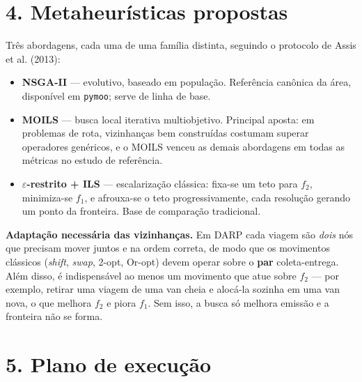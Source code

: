 \documentclass[10pt,a4paper]{article}
\theoremstyle{plain}
\begin{document}
\section*{4. Metaheurísticas propostas}

Três abordagens, cada uma de uma família distinta, seguindo o protocolo de Assis et al. (2013):

\begin{itemize}
    \item \textbf{NSGA-II} --- evolutivo, baseado em população. Referência canônica da área, disponível em \texttt{pymoo}; serve de linha de base.
    \item \textbf{MOILS} --- busca local iterativa multiobjetivo. Principal aposta: em problemas de rota, vizinhanças bem construídas costumam superar operadores genéricos, e o MOILS venceu as demais abordagens em todas as métricas no estudo de referência.
    \item \textbf{$\varepsilon$-restrito + ILS} --- escalarização clássica: fixa-se um teto para $f_2$, minimiza-se $f_1$, e afrouxa-se o teto progressivamente, cada resolução gerando um ponto da fronteira. Base de comparação tradicional.
\end{itemize}

\textbf{Adaptação necessária das vizinhanças.} Em DARP cada viagem são \textit{dois} nós que precisam mover juntos e na ordem correta, de modo que os movimentos clássicos (\textit{shift}, \textit{swap}, 2-opt, Or-opt) devem operar sobre o \textbf{par} coleta-entrega. Além disso, é indispensável ao menos um movimento que atue sobre $f_2$ --- por exemplo, retirar uma viagem de uma van cheia e alocá-la sozinha em uma van nova, o que melhora $f_2$ e piora $f_1$. Sem isso, a busca só melhora emissão e a fronteira não se forma.

\section*{5. Plano de execução}
\end{document}

